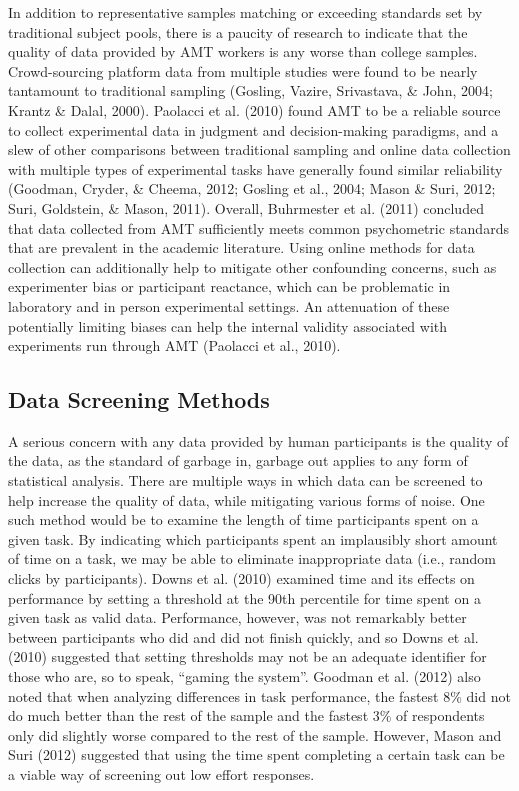 \documentclass[english,man]{apa6}
\theoremstyle{definition}
\theoremstyle{definition}
\theoremstyle{definition}
\theoremstyle{remark}
\begin{document}
In addition to representative samples matching or exceeding standards
set by traditional subject pools, there is a paucity of research to
indicate that the quality of data provided by AMT workers is any worse
than college samples. Crowd-sourcing platform data from multiple studies
were found to be nearly tantamount to traditional sampling (Gosling,
Vazire, Srivastava, \& John, 2004; Krantz \& Dalal, 2000). Paolacci et
al. (2010) found AMT to be a reliable source to collect experimental
data in judgment and decision-making paradigms, and a slew of other
comparisons between traditional sampling and online data collection with
multiple types of experimental tasks have generally found similar
reliability (Goodman, Cryder, \& Cheema, 2012; Gosling et al., 2004;
Mason \& Suri, 2012; Suri, Goldstein, \& Mason, 2011). Overall,
Buhrmester et al. (2011) concluded that data collected from AMT
sufficiently meets common psychometric standards that are prevalent in
the academic literature. Using online methods for data collection can
additionally help to mitigate other confounding concerns, such as
experimenter bias or participant reactance, which can be problematic in
laboratory and in person experimental settings. An attenuation of these
potentially limiting biases can help the internal validity associated
with experiments run through AMT (Paolacci et al., 2010).

\subsection{Data Screening Methods}\label{data-screening-methods}

A serious concern with any data provided by human participants is the
quality of the data, as the standard of garbage in, garbage out applies
to any form of statistical analysis. There are multiple ways in which
data can be screened to help increase the quality of data, while
mitigating various forms of noise. One such method would be to examine
the length of time participants spent on a given task. By indicating
which participants spent an implausibly short amount of time on a task,
we may be able to eliminate inappropriate data (i.e., random clicks by
participants). Downs et al. (2010) examined time and its effects on
performance by setting a threshold at the 90th percentile for time spent
on a given task as valid data. Performance, however, was not remarkably
better between participants who did and did not finish quickly, and so
Downs et al. (2010) suggested that setting thresholds may not be an
adequate identifier for those who are, so to speak, \enquote{gaming the
system}. Goodman et al. (2012) also noted that when analyzing
differences in task performance, the fastest 8\% did not do much better
than the rest of the sample and the fastest 3\% of respondents only did
slightly worse compared to the rest of the sample. However, Mason and
Suri (2012) suggested that using the time spent completing a certain
task can be a viable way of screening out low effort responses.
\end{document}
